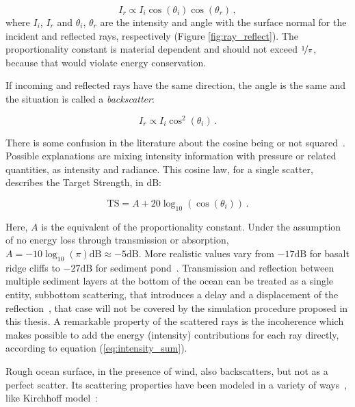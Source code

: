 \begin{equation}
\label{eq:lambertian}
I_r \propto	 I_i \cos(\theta_i) \cos(\theta_r)\,,
\end{equation}
%
where $I_i$,  $I_r$ and $\theta_i$, $\theta_r$ are the intensity and angle with
the surface normal for the incident and reflected rays,
respectively (Figure \ref{fig:ray_reflect}). The proportionality constant is
material dependent and should not exceed $\nicefrac{1}{\pi}$, because that would violate
energy conservation.

If incoming and reflected rays have the same direction, the angle is the same
and the situation is called a \textit{backscatter}:

\begin{equation*}
I_r \propto I_i \cos^2(\theta_i)\,.
\end{equation*}

There is some confusion in the literature about the cosine being or not
squared~\cite{durany2015analytical,cox2006tutorial,cox2004acoustic,jones2009modelling,LURTON,Etter2013}.
Possible explanations are mixing intensity information with pressure
or related quantities, as intensity and radiance. This cosine law, for a single
scatter, describes the Target Strength, in $\text{dB}$:

\begin{equation*}
\text{TS} = A + 20\log_{10}(\cos(\theta_i))\,.
\end{equation*}

Here, $A$ is the equivalent of the proportionality constant. Under the
assumption of no energy loss through transmission or absorption,
$A=-10\log_{10}(\pi)\text{dB} \approx -5\text{dB}$. More realistic values vary
from $-17\text{dB}$ for basalt ridge cliffs to $-27\text{dB}$ for sediment
pond~\cite{dunn2015springer}.
Transmission and reflection between multiple sediment layers at the bottom of
the ocean can be treated as a single entity, subbottom scattering, that introduces a
delay and a displacement of the reflection~\cite{Etter2013}, that case will not
be covered by the simulation procedure proposed in this thesis. A remarkable
property of the scattered rays is the incoherence which makes possible to add
the energy (intensity) contributions for each ray directly, according to
equation (\ref{eq:intensity_sum}).

Rough ocean surface, in the presence of wind, also backscatters, but not as a
perfect scatter. Its scattering properties have been modeled in a variety of
ways~\cite{jones2009modelling}, like Kirchhoff model~\cite{dunn2015springer}:

